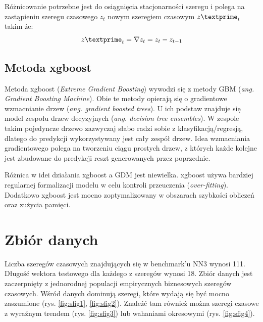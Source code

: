 \documentclass[11pt]{report}
\begin{document}
Różnicowanie potrzebne jest do osiągnięcia stacjonarności szeregu i polega na zastąpieniu szeregu czasowego $z_t$ nowym szeregiem czasowym $z\textprime_{t}$ takim że:
\begin{equation}
    z\textprime_{t} = \nabla z_{t} = z_t - z_{t-1}
\end{equation}

\subsection{Metoda xgboost}
Metoda xgboost (\textit{Extreme Gradient Boosting}) wywodzi się z metody GBM (\textit{ang. Gradient Boosting Machine}).
Obie te metody opierają się o gradientowe wzmacnianie drzew (\textit{ang. gradient boosted trees}).
U ich podstaw znajduje się model zespołu drzew decyzyjnych (\textit{ang. decision tree ensembles}).
W zespole takim pojedyncze drzewo zazwyczaj słabo radzi sobie z klasyfikacją/regresją, dlatego do predykcji wykorzystywany jest cały zespół drzew.
Idea wzmacniania gradientowego polega na tworzeniu ciągu prostych drzew, z których każde kolejne jest zbudowane do predykcji reszt generowanych przez poprzednie.

Różnica w idei działania xgboost a GDM jest niewielka.
xgboost używa bardziej regularnej formalizacji modelu w celu kontroli przeuczenia (\textit{over-fitting}).
Dodatkowo xgboost jest mocno zoptymalizowany w obszarach szybkości obliczeń oraz zużycia pamięci.

\section{Zbiór danych}
Liczba szeregów czasowych znajdujących się w benchmark'u NN3 wynosi 111.
Długość wektora testowego dla każdego z szeregów wynosi 18.
Zbiór danych jest zaczerpnięty z jednorodnej populacji empirycznych biznesowych szeregów czasowych.
Wśród danych dominują szeregi, które wydają się być mocno zaszumione (rys. \ref{fig:sfig1}, \ref{fig:sfig2}).
Znaleźć tam również można szeregi czasowe z wyraźnym trendem (rys. \ref{fig:sfig3}) lub wahaniami okresowymi (rys. \ref{fig:sfig4}).
\end{document}
